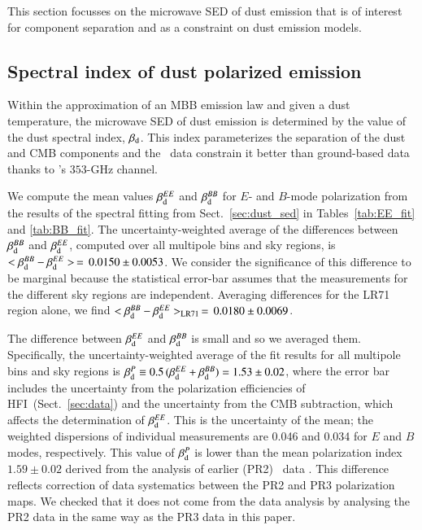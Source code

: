 \documentclass[longauth,traditabstract]{aa}
\newcommand{\HFI}{HFI}
\newcommand{\vbetap}{1.53} %
\newcommand{\vbetapu}{0.02} %
\begin{document}
This section focusses on the microwave SED of dust emission that is of interest for component separation and as a constraint on dust emission models. 

\subsection{Spectral index of dust polarized emission}
\label{subsec:beta_P}

Within the approximation of an MBB emission law and given a dust temperature, the microwave SED of dust emission is 
determined by the value of the dust spectral index, $\beta_{\rm d}$. 
This index parameterizes the separation of the dust and CMB components and the \Planck\ data constrain it better than ground-based data thanks to \Planck's $353$-GHz channel.  

We compute the mean values $\beta_{\rm d}^{EE}$ and $\beta_{\rm d}^{BB}$ for $E$- and $B$-mode polarization 
from the results of the spectral fitting from Sect.~\ref{sec:dust_sed} in Tables~\ref{tab:EE_fit} and \ref{tab:BB_fit}.
The uncertainty-weighted average of the differences between $\beta_{\rm d}^{BB}$ and $\beta_{\rm d}^{EE} $, computed over all multipole bins and sky regions, 
is  $<\beta_{\rm d}^{BB} - \beta_{\rm d}^{EE}>  \, = \, 0.0150 \pm  0.0053$. We consider the significance of this difference to be marginal because the statistical error-bar assumes 
that the measurements for the different sky regions are independent.
Averaging differences for the LR71 region alone, we find $<\beta_{\rm d}^{BB} - \beta_{\rm d}^{EE}>_{\rm LR71} \, =  \, 0.0180 \pm 0.0069$.

The difference between $\beta_{\rm d}^{EE} $ and $\beta_{\rm d}^{BB}$ is small and so we averaged them. 
Specifically, the uncertainty-weighted average of the fit results for all multipole bins and sky regions 
is $\beta_{\rm d}^P \equiv  0.5\,(\beta_{\rm d}^{EE}  + \beta_{\rm d}^{BB}) = 
\vbetap\pm\vbetapu$,
where the error bar includes the uncertainty from the polarization efficiencies of \HFI\ (Sect.~\ref{sec:data}) and 
the uncertainty from the CMB subtraction, which affects the determination of $\beta_{\rm d}^{EE}$. 
This is the uncertainty of the mean; the weighted dispersions of individual measurements are 0.046 and 0.034 for $E$ and $B$ modes, respectively. 
%
This value of $\beta_{\rm d}^P$ is lower than the mean polarization index $1.59\pm0.02$ derived from the analysis of earlier (PR2) 
\Planck\ data \citep{planck2014-XXII}. This difference reflects correction of data systematics between the PR2 and PR3 polarization maps. 
We checked that it does not come from the data analysis by analysing  the PR2 data in the same way as the PR3 data in this paper. 
\end{document}
